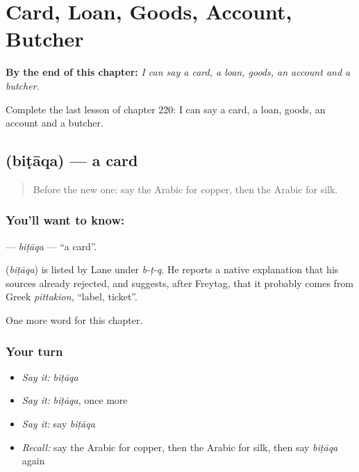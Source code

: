 
\chapter{Card, Loan, Goods, Account, Butcher}
\label{ch:ar-card-loan-goods-account-butcher}

\begin{chapteropening}
\textbf{By the end of this chapter:} \emph{I can say a card, a loan, goods, an account and a butcher.}

Complete the last lesson of chapter 220: I can say a card, a loan, goods, an account and a butcher.
\end{chapteropening}

\section[\texorpdfstring{\ar{بطاقة} (biṭāqa)}{بطاقة (biṭāqa)}]{ (biṭāqa) — a card}

\label{lesson:AR-C220-bitaqa}



\begin{quote}
Before the new one: say the Arabic for copper, then the Arabic for silk.
\end{quote}

\subsection*{You'll want to know: }
\textbf{} — \emph{biṭāqa} — \textquotedblleft{}a card\textquotedblright{}.

\begin{cousinweb}
\textbf{} (\emph{biṭāqa}) is listed by Lane under \emph{b-ṭ-q}. He reports a native explanation that his sources already rejected, and suggests, after Freytag, that it probably comes from Greek \emph{pittakion}, \textquotedblleft{}label, ticket\textquotedblright{}.
\end{cousinweb}

\begin{grammarlens}[title={What you've built}]
One more word for this chapter.
\end{grammarlens}

\subsection*{Your turn}
\begin{itemize}
\raggedright
  \item \emph{Say it:} \emph{biṭāqa}
  \item \emph{Say it:} \emph{biṭāqa}, once more
  \item \emph{Say it:} say \emph{biṭāqa}
  \item \emph{Recall:} say the Arabic for copper, then the Arabic for silk, then say \emph{biṭāqa} again
\end{itemize}

